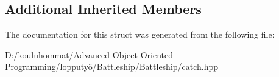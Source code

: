 \subsection*{Additional Inherited Members}


The documentation for this struct was generated from the following file\+:\begin{DoxyCompactItemize}
\item 
D\+:/kouluhommat/\+Advanced Object-\/\+Oriented Programming/lopputyö/\+Battleship/\+Battleship/catch.\+hpp\end{DoxyCompactItemize}
